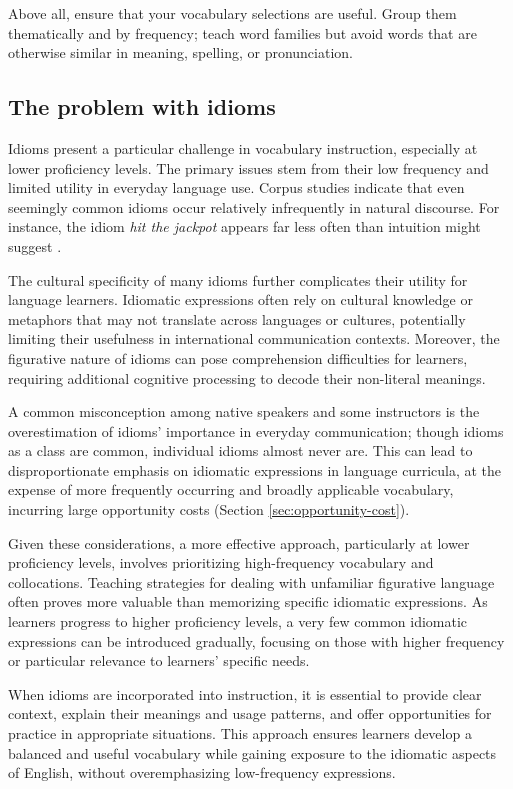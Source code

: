 Above all, ensure that your vocabulary selections are useful. Group them thematically and by frequency; teach word families but avoid words that are otherwise similar in meaning, spelling, or pronunciation.

\subsection{The problem with idioms}

Idioms present a particular challenge in vocabulary instruction, especially at lower proficiency levels. The primary issues stem from their low frequency and limited utility in everyday language use. Corpus studies indicate that even seemingly common idioms occur relatively infrequently in natural discourse. For instance, the idiom \textit{hit the jackpot} appears far less often than intuition might suggest \citep{reynolds2007idioms}.

The cultural specificity of many idioms further complicates their utility for language learners. Idiomatic expressions often rely on cultural knowledge or metaphors that may not translate across languages or cultures, potentially limiting their usefulness in international communication contexts. Moreover, the figurative nature of idioms can pose comprehension difficulties for learners, requiring additional cognitive processing to decode their non-literal meanings.

A common misconception among native speakers and some instructors is the overestimation of idioms' importance in everyday communication; though idioms as a class are common, individual idioms almost never are. This can lead to disproportionate emphasis on idiomatic expressions in language curricula, at the expense of more frequently occurring and broadly applicable vocabulary, incurring large opportunity costs (Section \ref{sec:opportunity-cost}).

Given these considerations, a more effective approach, particularly at lower proficiency levels, involves prioritizing high-frequency vocabulary and collocations. Teaching strategies for dealing with unfamiliar figurative language often proves more valuable than memorizing specific idiomatic expressions. As learners progress to higher proficiency levels, a very few common idiomatic expressions can be introduced gradually, focusing on those with higher frequency or particular relevance to learners' specific needs.

When idioms are incorporated into instruction, it is essential to provide clear context, explain their meanings and usage patterns, and offer opportunities for practice in appropriate situations. This approach ensures learners develop a balanced and useful vocabulary while gaining exposure to the idiomatic aspects of English, without overemphasizing low-frequency expressions.

